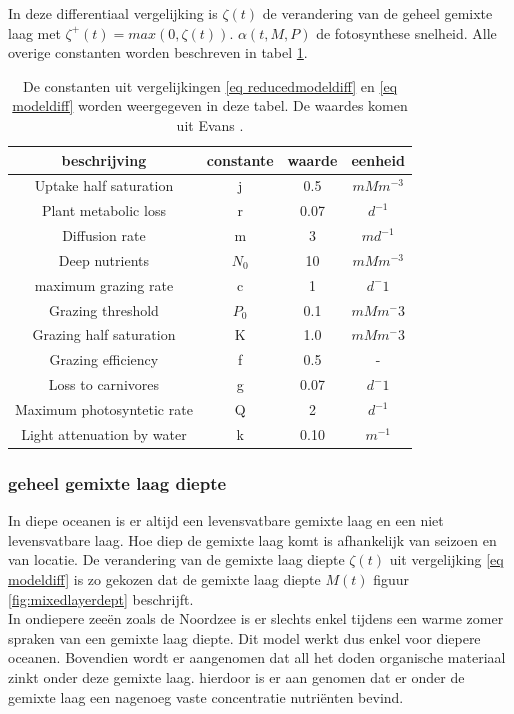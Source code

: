In deze differentiaal vergelijking is $\zeta(t)$ de verandering van de geheel gemixte laag met $\zeta^+(t)= max(0,\zeta(t))$.
$\alpha(t,M,P)$ de fotosynthese snelheid. Alle overige constanten worden beschreven in tabel \ref{table:consts}.

\begin{table}[H]
\begin{center}
 \caption{\label{table:consts}De constanten uit vergelijkingen \ref{eq reducedmodeldiff} en \ref{eq modeldiff} worden weergegeven in deze tabel. De waardes komen uit Evans \cite{Algen1985}.}
     \begin{tabular}{|c c c c|} 
     \hline
     beschrijving & constante & waarde & eenheid \\ [0.5ex] 
     \hline\hline
     Uptake half saturation & j & 0.5 & $mM m^{-3}$  \\ 
     \hline
     Plant metabolic loss & r & 0.07 & $d^{-1}$  \\
     \hline
     Diffusion rate & m & 3 & $md^{-1}$  \\
     \hline
     Deep nutrients & $N_0$ & 10 & $mM m^{-3}$ \\
     \hline
      maximum grazing rate & c & 1 & $d^-1$  \\
     \hline
     Grazing threshold & $P_0$ & 0.1 & $mM m^-3$\\
     \hline
      Grazing half saturation & K & 1.0 & $mM m^-3$\\
     \hline
      Grazing efficiency & f & 0.5 & -\\
     \hline
     Loss to carnivores & g & 0.07 & $d^-1$ \\ 
     \hline
     Maximum photosyntetic rate & Q & 2 & $d^{-1}$ \\
     \hline
     Light attenuation by water & k & 0.10 & $m^{-1}$ \\
     \hline
    \end{tabular}

\end{center}
\end{table}

\subsubsection{geheel gemixte laag diepte}
In diepe oceanen is er altijd een levensvatbare gemixte laag en een niet levensvatbare laag. Hoe diep de gemixte laag komt is afhankelijk van seizoen en van locatie. De verandering van de gemixte laag diepte $\zeta(t)$ uit vergelijking \ref{eq modeldiff} is zo gekozen dat de gemixte laag diepte $M(t)$ figuur \ref{fig:mixedlayerdept} beschrijft.\\
In ondiepere zeeën zoals de Noordzee is er slechts enkel tijdens een warme zomer spraken van een gemixte laag diepte. Dit model werkt dus enkel voor diepere oceanen. Bovendien wordt er aangenomen dat all het doden organische materiaal zinkt onder deze gemixte laag. hierdoor is er aan genomen dat er onder de gemixte laag een nagenoeg vaste concentratie nutriënten bevind.

